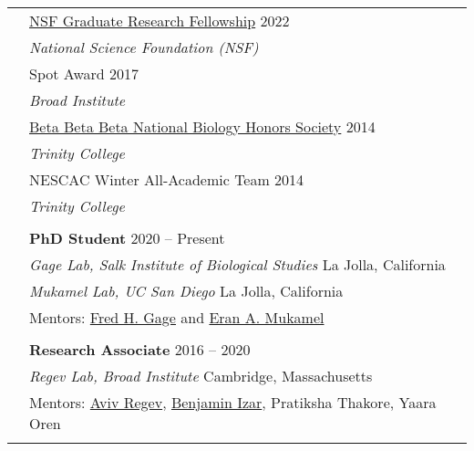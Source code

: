\documentclass[letterpaper, 11pt]{article}
\begin{document}
\begin{longtable}{p{1.6in}p{4.9in}}

{\color{OliveGreen}{Honors and}} 
{\color{OliveGreen}{Awards}} 
& \href{https://www.nsfgrfp.orgresources/about-grfp/}{NSF Graduate Research Fellowship} \hfill 2022\\
& \hspace{0.1in} \textit{National Science Foundation (NSF)} \\
& Spot Award \hfill 2017 \\
& \hspace{0.1in} \textit{Broad Institute} \\
& \href{https://www.tribeta.org/about-beta-beta-beta}{Beta Beta Beta National Biology Honors Society} \hfill 2014 \\
& \hspace{0.1in} \textit{Trinity College} \\
& NESCAC Winter All-Academic Team \hfill 2014 \\
& \hspace{0.1in} \textit{Trinity College} \\
& \\


{\color{OliveGreen}{Research experience}}
& \textbf{PhD Student} \hfill 2020 -- Present   \\
& \textit{Gage Lab, Salk Institute of Biological Studies} \hfill La Jolla, California \\
& \textit{Mukamel Lab, UC San Diego} \hfill La Jolla, California \\
& Mentors: \href{https://www.salk.edu/scientist/rusty-gage/}{Fred H. Gage} and 
\href{https://cogsci.ucsd.edu/people/faculty/eran-mukamel.html}{Eran A. Mukamel} \\
& \\
 
& \textbf{Research Associate} \hfill 2016 -- 2020  \\
& \textit{Regev Lab, Broad Institute} \hfill Cambridge, Massachusetts \\
& Mentors: \href{https://www.roche.com/about/leadership/aviv-regev}{Aviv Regev}, 
\href{https://www.cancer.columbia.edu/profile/benjamin-izar-md}{Benjamin Izar}, 
Pratiksha Thakore, 
Yaara Oren \\
& \\


\end{longtable}
\end{document}
